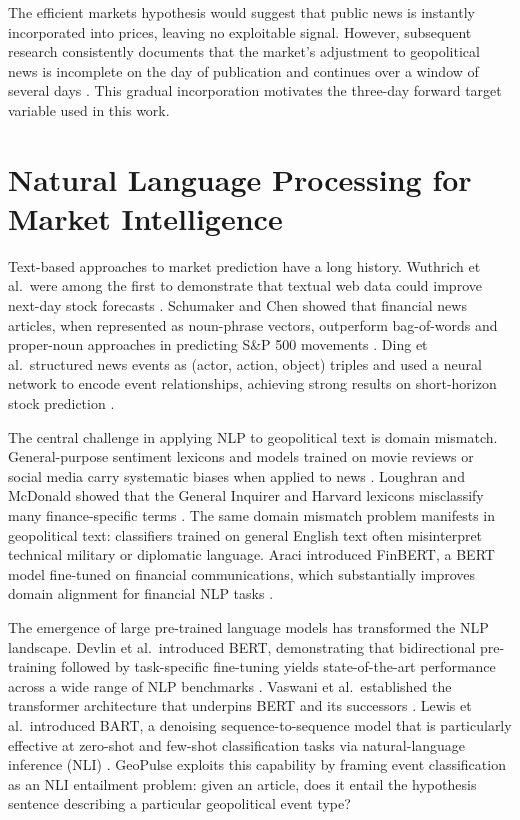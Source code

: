 \documentclass[12pt,a4paper]{report}
\begin{document}
The efficient markets hypothesis \cite{fama1970} would suggest that public
news is instantly incorporated into prices, leaving no exploitable signal.
However, subsequent research consistently documents that the market's adjustment
to geopolitical news is incomplete on the day of publication and continues over
a window of several days \cite{mitchell1994}. This gradual incorporation
motivates the three-day forward target variable used in this work.

\section{Natural Language Processing for Market Intelligence}

Text-based approaches to market prediction have a long history. Wuthrich
et al.\ were among the first to demonstrate that textual web data could
improve next-day stock forecasts \cite{wuthrich1998}. Schumaker and Chen
showed that financial news articles, when represented as noun-phrase vectors,
outperform bag-of-words and proper-noun approaches in predicting S\&P 500
movements \cite{schumaker2009}. Ding et al.\ structured news events as
(actor, action, object) triples and used a neural network to encode event
relationships, achieving strong results on short-horizon stock prediction
\cite{ding2014}.

The central challenge in applying NLP to geopolitical text is domain mismatch.
General-purpose sentiment lexicons and models trained on movie reviews or
social media carry systematic biases when applied to news \cite{loughran2011}.
Loughran and McDonald showed that the General Inquirer and Harvard lexicons
misclassify many finance-specific terms \cite{loughran2011}. The same domain
mismatch problem manifests in geopolitical text: classifiers trained on
general English text often misinterpret technical military or diplomatic
language. Araci introduced FinBERT, a BERT model fine-tuned on financial
communications, which substantially improves domain alignment for financial
NLP tasks \cite{araci2019}.

The emergence of large pre-trained language models has transformed the NLP
landscape. Devlin et al.\ introduced BERT, demonstrating that bidirectional
pre-training followed by task-specific fine-tuning yields state-of-the-art
performance across a wide range of NLP benchmarks \cite{devlin2019}. Vaswani
et al.\ established the transformer architecture that underpins BERT and its
successors \cite{vaswani2017}. Lewis et al.\ introduced BART, a denoising
sequence-to-sequence model that is particularly effective at zero-shot and
few-shot classification tasks via natural-language inference (NLI)
\cite{lewis2020}. GeoPulse exploits this capability by framing event
classification as an NLI entailment problem: given an article, does it entail
the hypothesis sentence describing a particular geopolitical event type?
\end{document}
